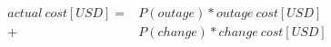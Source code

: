 \documentclass[../main.tex]{subfiles}
\begin{document}
    \begin{figure}[h]
        \begin{equation}
            \label{eq:actual_cost}
            \begin{split}
                actual\ cost[USD] =& P(outage) * outage\ cost[USD] \\
                +& P(change) * change\ cost[USD]
            \end{split}
        \end{equation}
    \end{figure}
\end{document}
